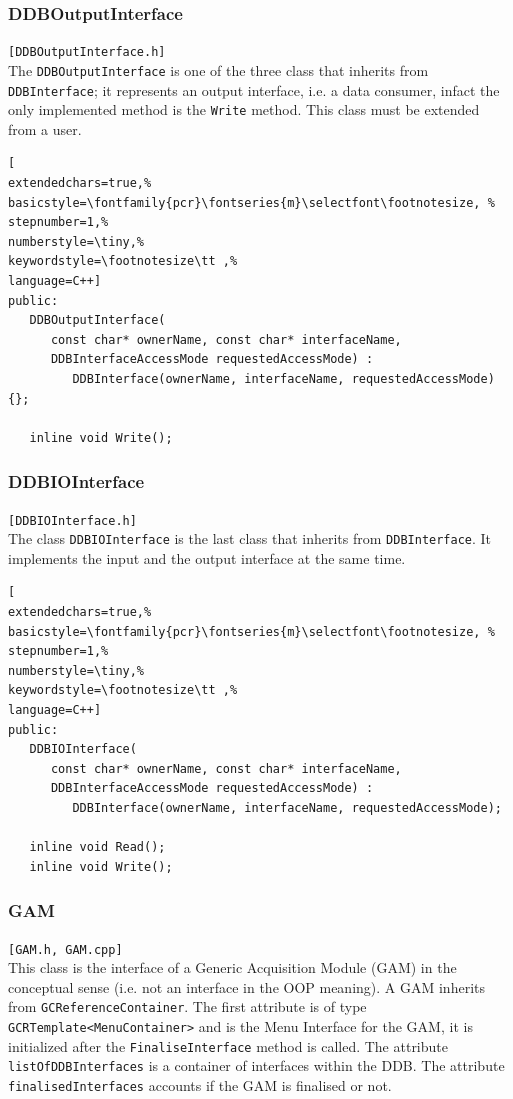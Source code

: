 \subsubsection{DDBOutputInterface}
\texttt{[DDBOutputInterface.h]}\\
The \texttt{DDBOutputInterface} is one of the three class that inherits from \texttt{DDBInterface}; it represents an output interface, i.e. a data consumer, infact the only implemented method is the \texttt{Write} method. This class must be extended from a user.
\begin{lstlisting}[
extendedchars=true,%
basicstyle=\fontfamily{pcr}\fontseries{m}\selectfont\footnotesize, %
stepnumber=1,%
numberstyle=\tiny,%
keywordstyle=\footnotesize\tt ,%
language=C++]
public:
   DDBOutputInterface(
      const char* ownerName, const char* interfaceName,
      DDBInterfaceAccessMode requestedAccessMode) :
         DDBInterface(ownerName, interfaceName, requestedAccessMode){};

   inline void Write();
\end{lstlisting}



\subsubsection{DDBIOInterface}
\texttt{[DDBIOInterface.h]}\\
The class \texttt{DDBIOInterface} is the last class that inherits from \texttt{DDBInterface}.
It implements the input and the output interface at the same time.
\begin{lstlisting}[
extendedchars=true,%
basicstyle=\fontfamily{pcr}\fontseries{m}\selectfont\footnotesize, %
stepnumber=1,%
numberstyle=\tiny,%
keywordstyle=\footnotesize\tt ,%
language=C++]
public:
   DDBIOInterface(
      const char* ownerName, const char* interfaceName,
      DDBInterfaceAccessMode requestedAccessMode) :
         DDBInterface(ownerName, interfaceName, requestedAccessMode);

   inline void Read();
   inline void Write();
\end{lstlisting}



\subsubsection{GAM}
\texttt{[GAM.h, GAM.cpp]}\\
This class is the interface of a Generic Acquisition Module (GAM) in the conceptual sense (i.e. not an interface in the OOP meaning). A GAM inherits from \texttt{GCReferenceContainer}. The first attribute is of type \texttt{GCRTemplate<MenuContainer>} and is the Menu Interface for the GAM, it is initialized after the \texttt{FinaliseInterface} method is called. The attribute \texttt{listOfDDBInterfaces} is a container of interfaces within the DDB. The attribute \texttt{finalisedInterfaces} accounts if the GAM is finalised or not.

